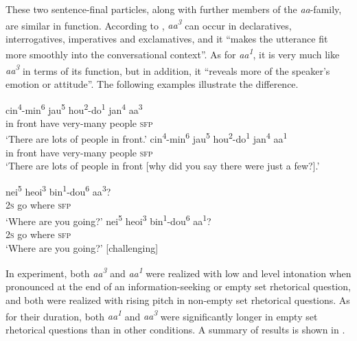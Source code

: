 \documentclass[output=paper,colorlinks,citecolor=brown            ,chinesefont]{langscibook}
\begin{document}
These two sentence-final particles, along with further members of the \textit{aa}-family, are similar in function. According to \citet[1760]{Sybesma+2007}, \textit{aa\textsuperscript{3}} can occur in declaratives, interrogatives, imperatives and exclamatives, and it ``makes the utterance fit more smoothly into the conversational context''. As for \textit{aa\textsuperscript{1}}, it is very much like \textit{aa\textsuperscript{3}} in terms of its function, but in addition, it ``reveals more of the speaker's emotion or attitude''. The following examples illustrate the difference.

\begin{exe}
\ex\label{aaI}
\begin{xlist}
\ex\label{aa1} \gll cin\textsuperscript{4}-min\textsuperscript{6} jau\textsuperscript{5} hou\textsuperscript{2}-do\textsuperscript{1} jan\textsuperscript{4} aa\textsuperscript{3} \\
{in front} have very-many people \textsc{sfp}\\
\glt `There are lots of people in front.'
\ex\label{aa2} \gll cin\textsuperscript{4}-min\textsuperscript{6} jau\textsuperscript{5} hou\textsuperscript{2}-do\textsuperscript{1} jan\textsuperscript{4} aa\textsuperscript{1} \\
{in front} have very-many people \textsc{sfp}\\
\glt `There are lots of people in front [why did you say there were just a few?].' \hfill \citep{Sybesma+2007}
\end{xlist}
\end{exe}

\begin{exe}
\ex\label{aaII}
\begin{xlist}
\ex\label{aa3} \gll nei\textsuperscript{5} heoi\textsuperscript{3} bin\textsuperscript{1}-dou\textsuperscript{6} aa\textsuperscript{3}?\\
2\textsc{s} go where \textsc{sfp} \\
\trans `Where are you going?'
\ex\label{aa4} \gll nei\textsuperscript{5} heoi\textsuperscript{3} bin\textsuperscript{1}-dou\textsuperscript{6} aa\textsuperscript{1}?\\
2\textsc{s} go where \textsc{sfp} \\
\trans `Where are you going?' [challenging] \hfill \citep{Sybesma+2007}
\end{xlist}
\end{exe}

In  experiment, both \textit{aa\textsuperscript{3}} and \textit{aa\textsuperscript{1}} were realized with low and level intonation when pronounced at the end of an information-seeking or empty set rhetorical question, and both were realized with rising pitch in non-empty set rhetorical questions. As for their duration, both \textit{aa\textsuperscript{1}} and \textit{aa\textsuperscript{3}} were significantly longer in empty set rhetorical questions than in other conditions. A summary of  results is shown in .
\end{document}
